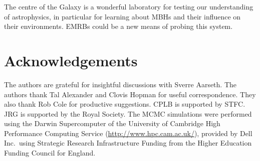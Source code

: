 \documentclass[useAMS,usedcolumn,usegraphicx,usenatbib]{mn2e}
\begin{document}
The centre of the Galaxy is a wonderful laboratory for testing our understanding of astrophysics, in particular for learning about MBHs and their influence on their environments. EMRBs could be a new means of probing this system.

\section*{Acknowledgements}
The authors are grateful for insightful discussions with Sverre Aarseth. The authors thank Tal Alexander and Clovis Hopman for useful correspondence. They also thank Rob Cole for productive suggestions. CPLB is supported by STFC. JRG is supported by the Royal Society. The MCMC simulations were performed using the Darwin Supercomputer of the University of Cambridge High Performance Computing Service (\url{http://www.hpc.cam.ac.uk/}), provided by Dell Inc.\ using Strategic Research Infrastructure Funding from the Higher Education Funding Council for England.




\appendix
\end{document}
